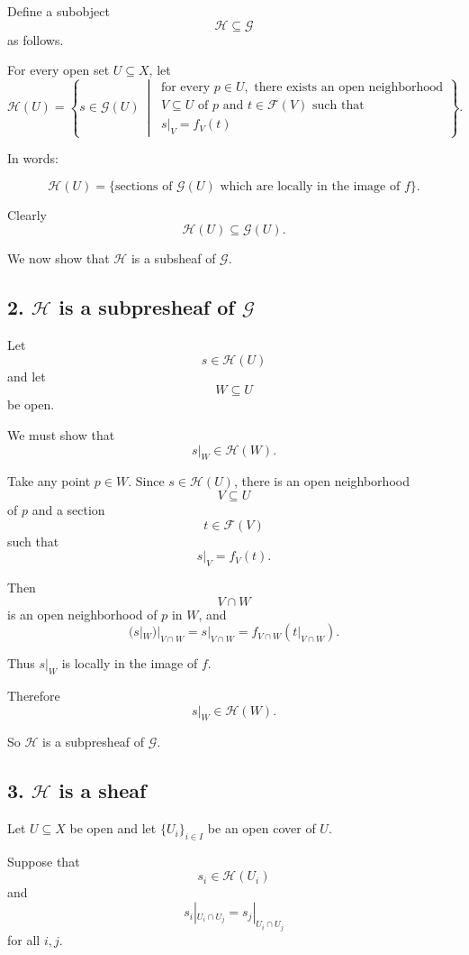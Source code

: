 \documentclass[12pt,a4paper]{article}
\begin{document}
Define a subobject
\[
\mathcal H \subseteq \mathcal G
\]
as follows.

For every open set $U \subseteq X$, let
\[
\mathcal H(U)
=
\left\{
s \in \mathcal G(U)
\ \middle|\
\begin{array}{l}
	\text{for every } p \in U, \text{ there exists an open neighborhood}
	\\
	V \subseteq U \text{ of } p
	\text{ and } t \in \mathcal F(V)
	\text{ such that}
	\\
	s|_V = f_V(t)
\end{array}
\right\}.
\]

In words:

\[
\mathcal H(U)
=
\{\text{sections of } \mathcal G(U)
\text{ which are locally in the image of } f\}.
\]

Clearly
\[
\mathcal H(U) \subseteq \mathcal G(U).
\]

We now show that $\mathcal H$ is a subsheaf of $\mathcal G$.

\subsection*{2. $\mathcal H$ is a subpresheaf of $\mathcal G$}

Let
\[
s \in \mathcal H(U)
\]
and let
\[
W \subseteq U
\]
be open.

We must show that
\[
s|_W \in \mathcal H(W).
\]

Take any point $p \in W$.
Since $s \in \mathcal H(U)$, there is an open neighborhood
\[
V \subseteq U
\]
of $p$ and a section
\[
t \in \mathcal F(V)
\]
such that
\[
s|_V = f_V(t).
\]

Then
\[
V \cap W
\]
is an open neighborhood of $p$ in $W$, and
\[
(s|_W)|_{V \cap W}
=
s|_{V \cap W}
=
f_{V \cap W}(t|_{V \cap W}).
\]

Thus $s|_W$ is locally in the image of $f$.

Therefore
\[
s|_W \in \mathcal H(W).
\]

So $\mathcal H$ is a subpresheaf of $\mathcal G$.

\subsection*{3. $\mathcal H$ is a sheaf}

Let $U \subseteq X$ be open and let $\{U_i\}_{i \in I}$ be an open cover of $U$.

Suppose that
\[
s_i \in \mathcal H(U_i)
\]
and
\[
s_i|_{U_i \cap U_j}
=
s_j|_{U_i \cap U_j}
\]
for all $i,j$.
\end{document}
